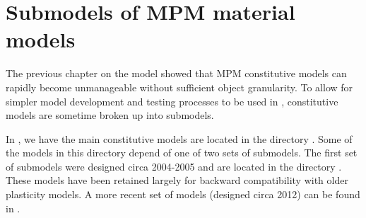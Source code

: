 \chapter{Submodels of MPM material models}
The previous chapter on the \Arena model showed that MPM constitutive models can
rapidly become unmanageable without sufficient object granularity.  To allow
for simpler model development and testing processes to be used in \Vaango, 
constitutive models are sometime broken up into submodels.

In \Vaango, we have the main constitutive models are located in the directory
.  Some of the models in
this directory depend of one of two sets of submodels.  The first set of 
submodels were designed circa 2004-2005 and are located in the directory
.  These models have been 
retained largely for backward compatibility with older plasticity models.
A more recent set of models (designed circa 2012) can be found in 
.











